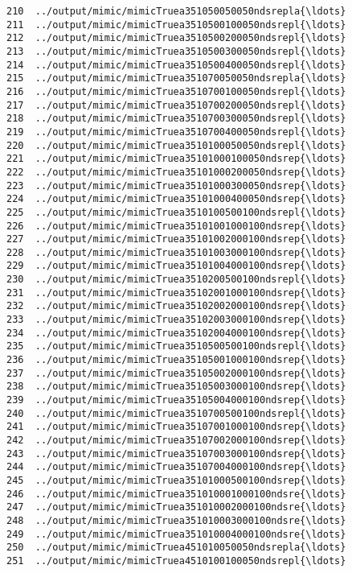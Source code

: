 \documentclass[11pt]{article}
\begin{document}
\begin{Verbatim}[commandchars=\\\{\}]
210  ../output/mimic/mimicTruea351050050050ndsrepla{\ldots}  
211  ../output/mimic/mimicTruea3510500100050ndsrepl{\ldots}  
212  ../output/mimic/mimicTruea3510500200050ndsrepl{\ldots}  
213  ../output/mimic/mimicTruea3510500300050ndsrepl{\ldots}  
214  ../output/mimic/mimicTruea3510500400050ndsrepl{\ldots}  
215  ../output/mimic/mimicTruea351070050050ndsrepla{\ldots}  
216  ../output/mimic/mimicTruea3510700100050ndsrepl{\ldots}  
217  ../output/mimic/mimicTruea3510700200050ndsrepl{\ldots}  
218  ../output/mimic/mimicTruea3510700300050ndsrepl{\ldots}  
219  ../output/mimic/mimicTruea3510700400050ndsrepl{\ldots}  
220  ../output/mimic/mimicTruea3510100050050ndsrepl{\ldots}  
221  ../output/mimic/mimicTruea35101000100050ndsrep{\ldots}  
222  ../output/mimic/mimicTruea35101000200050ndsrep{\ldots}  
223  ../output/mimic/mimicTruea35101000300050ndsrep{\ldots}  
224  ../output/mimic/mimicTruea35101000400050ndsrep{\ldots}  
225  ../output/mimic/mimicTruea3510100500100ndsrepl{\ldots}  
226  ../output/mimic/mimicTruea35101001000100ndsrep{\ldots}  
227  ../output/mimic/mimicTruea35101002000100ndsrep{\ldots}  
228  ../output/mimic/mimicTruea35101003000100ndsrep{\ldots}  
229  ../output/mimic/mimicTruea35101004000100ndsrep{\ldots}  
230  ../output/mimic/mimicTruea3510200500100ndsrepl{\ldots}  
231  ../output/mimic/mimicTruea35102001000100ndsrep{\ldots}  
232  ../output/mimic/mimicTruea35102002000100ndsrep{\ldots}  
233  ../output/mimic/mimicTruea35102003000100ndsrep{\ldots}  
234  ../output/mimic/mimicTruea35102004000100ndsrep{\ldots}  
235  ../output/mimic/mimicTruea3510500500100ndsrepl{\ldots}  
236  ../output/mimic/mimicTruea35105001000100ndsrep{\ldots}  
237  ../output/mimic/mimicTruea35105002000100ndsrep{\ldots}  
238  ../output/mimic/mimicTruea35105003000100ndsrep{\ldots}  
239  ../output/mimic/mimicTruea35105004000100ndsrep{\ldots}  
240  ../output/mimic/mimicTruea3510700500100ndsrepl{\ldots}  
241  ../output/mimic/mimicTruea35107001000100ndsrep{\ldots}  
242  ../output/mimic/mimicTruea35107002000100ndsrep{\ldots}  
243  ../output/mimic/mimicTruea35107003000100ndsrep{\ldots}  
244  ../output/mimic/mimicTruea35107004000100ndsrep{\ldots}  
245  ../output/mimic/mimicTruea35101000500100ndsrep{\ldots}  
246  ../output/mimic/mimicTruea351010001000100ndsre{\ldots}  
247  ../output/mimic/mimicTruea351010002000100ndsre{\ldots}  
248  ../output/mimic/mimicTruea351010003000100ndsre{\ldots}  
249  ../output/mimic/mimicTruea351010004000100ndsre{\ldots}  
250  ../output/mimic/mimicTruea451010050050ndsrepla{\ldots}  
251  ../output/mimic/mimicTruea4510100100050ndsrepl{\ldots}  

\end{Verbatim}
\end{document}
